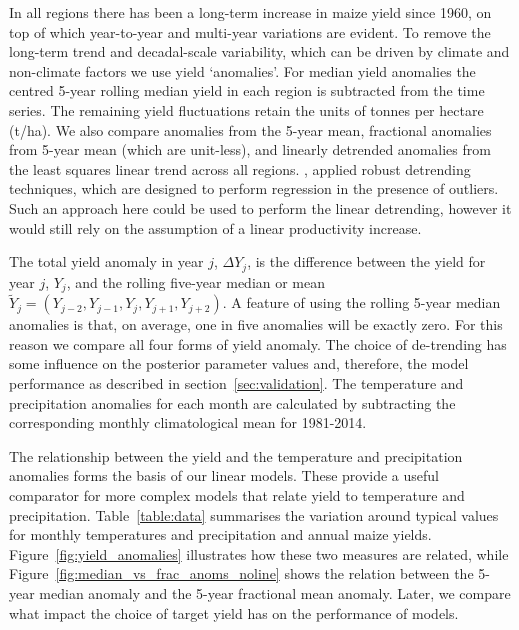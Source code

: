 \documentclass[12pt]{iopart}
\newcommand{\remove}[1]{}
\newcommand{\add}[1]{#1}
\begin{document}
In all regions there has been a long-term increase in maize yield since 1960, on top of which year-to-year and multi-year variations are evident. To remove the long-term trend and decadal-scale variability, which can be driven by climate and non-climate factors \citep[e.g.][]{hawkins:2013, ray:2015} we use yield `anomalies'. For median yield anomalies the centred 5-year rolling median yield in each region is subtracted from the time series. The remaining yield fluctuations retain the units of tonnes per hectare (t/ha). We also compare \remove{anolies}\add{anomalies} from the 5-year mean, fractional anomalies from 5-year mean (which are unit-less), and linearly detrended anomalies from the least squares linear trend across all regions. \add{\citet{finger:2010}, applied robust detrending techniques, which are designed to perform regression in the presence of outliers. Such an approach here could be used to perform the linear detrending, however it would still rely on the assumption of a linear productivity increase.}

The total yield anomaly in year $j$, $\Delta Y_j$, is the difference between the yield for year $j$, $Y_j$, and the rolling five-year median or mean $\widetilde{Y}_j = (Y_{j-2},Y_{j-1},Y_{j},Y_{j+1},Y_{j+2} )$. A feature of using the rolling 5-year median anomalies is that, on average, one in five anomalies will be exactly zero. For this reason we compare all four forms of yield anomaly. The choice of de-trending has some influence on the posterior parameter values and, therefore, the model performance as described in section~\ref{sec:validation}. The temperature and precipitation anomalies for each month are calculated by subtracting the corresponding monthly climatological mean for 1981-2014. 

The relationship between the yield and the temperature and precipitation anomalies forms the basis of our linear models. These provide a useful comparator for more complex models that relate yield to temperature and precipitation. Table~\ref{table:data} summarises the variation around typical values for monthly temperatures and precipitation and annual maize yields. Figure~\ref{fig:yield_anomalies} illustrates how these two measures are related, while Figure~\ref{fig:median_vs_frac_anoms_noline} shows the relation between the 5-year median anomaly and the 5-year fractional mean anomaly. Later, we compare what impact the choice of target yield has on the performance of models.
\end{document}

